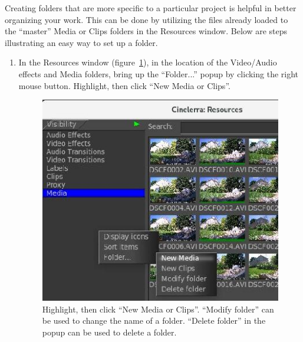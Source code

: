Creating folders that are more specific to a particular project is helpful in better organizing your work.  
This can be done by utilizing the files already loaded to the “master” Media or Clips folders in the Resources window.  
Below are steps illustrating an easy way to set up a folder.

\begin{enumerate}
    \item In the Resources window (figure~\ref{fig:folder_resources}), in the location of the Video/Audio effects and Media folders, bring up the “Folder...” popup by clicking the right mouse button.  
        Highlight, then click “New Media or Clips”.
        \begin{figure}[htpb]
            \begin{minipage}{.55\linewidth}
                \centering
                \includegraphics[width=0.9\linewidth]{images/folder_resources.png}
                \caption{Highlight, then click “New Media or Clips”.
                    “Modify folder” can be used to   change the name of a folder.
                    “Delete folder” in the popup can be used to delete a folder.
                }
                \label{fig:folder_resources}
            \end{minipage}
            \hfill
            \begin{minipage}{.35\linewidth}
                \centering
                \vspace{18ex}


\end{minipage}
\end{figure}
\end{enumerate}
